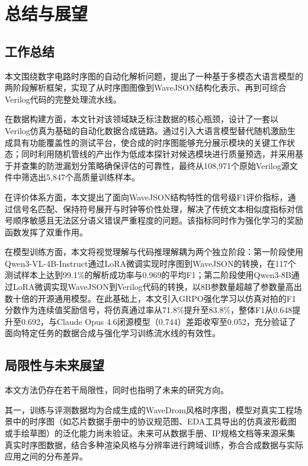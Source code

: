 
\chapter{总结与展望}

\section{工作总结}

本文围绕数字电路时序图的自动化解析问题，提出了一种基于多模态大语言模型的两阶段解析框架，实现了从时序图图像到WaveJSON结构化表示、再到可综合Verilog代码的完整处理流水线。

在数据构建方面，本文针对该领域缺乏标注数据的核心瓶颈，设计了一套以Verilog仿真为基础的自动化数据合成链路。通过引入大语言模型替代随机激励生成具有功能覆盖性的测试平台，使合成的时序图能够充分展示模块的关键工作状态；同时利用随机管线的产出作为低成本探针对候选模块进行质量预选，并采用基于并查集的防泄漏划分策略确保评估的可靠性，最终从108{,}971个原始Verilog源文件中筛选出5{,}847个高质量训练样本。

在评价体系方面，本文提出了面向WaveJSON结构特性的信号级F1评价指标，通过信号名匹配、保持符号展开与时钟等价性处理，解决了传统文本相似度指标对信号顺序敏感且无法区分语义错误严重程度的问题。该指标同时作为强化学习的奖励函数发挥了双重作用。

在模型训练方面，本文将视觉理解与代码推理解耦为两个独立阶段：第一阶段使用Qwen3-VL-4B-Instruct通过LoRA微调实现时序图到WaveJSON的转换，在117个测试样本上达到99.1\%的解析成功率与0.969的平均F1；第二阶段使用Qwen3-8B通过LoRA微调实现WaveJSON到Verilog代码的转换，以8B参数量超越了参数量高出数十倍的开源通用模型。在此基础上，本文引入GRPO强化学习以仿真对拍的F1分数作为连续值奖励信号，将仿真通过率从71.8\%提升至83.8\%，整体F1从0.648提升至0.692，与Claude Opus 4.6闭源模型（0.744）差距收窄至0.052，充分验证了面向特定任务的数据合成与强化学习训练流水线的有效性。


\section{局限性与未来展望}

本文方法仍存在若干局限性，同时也指明了未来的研究方向。

其一，训练与评测数据均为合成生成的WaveDrom风格时序图，模型对真实工程场景中的时序图（如芯片数据手册中的协议规范图、EDA工具导出的仿真波形截图或手绘草图）的泛化能力尚未验证。未来可从数据手册、IP规格文档等来源采集真实时序图数据，结合多种渲染风格与分辨率进行跨域训练，弥合合成数据与实际应用之间的分布差异。

